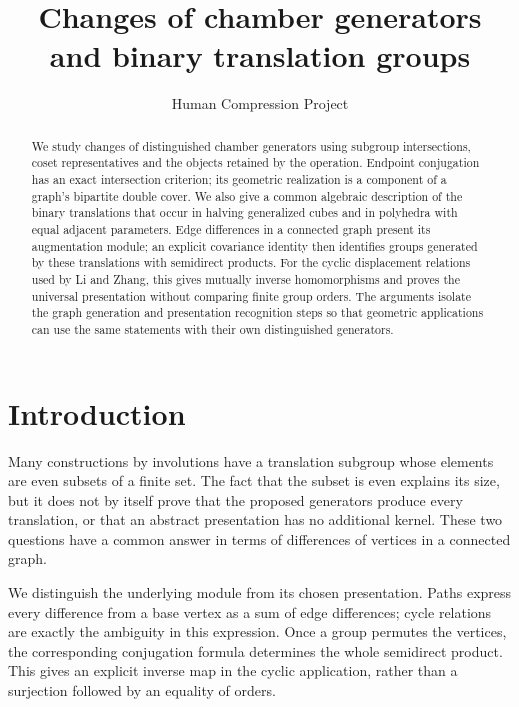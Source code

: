 
\title{Changes of chamber generators and binary translation groups}
\author{Human Compression Project}
\date{}

\maketitle
\begin{abstract}
We study changes of distinguished chamber generators using subgroup
intersections, coset representatives and the objects retained by the
operation. Endpoint conjugation has an exact intersection criterion;
its geometric realization is a component of a graph's bipartite double
cover. We also give a common algebraic description of the binary translations that
occur in halving generalized cubes and in polyhedra with equal adjacent parameters.
Edge differences in a connected graph present its augmentation module;
an explicit covariance identity then identifies groups generated by
these translations with semidirect products. For the cyclic displacement
relations used by Li and Zhang, this gives mutually inverse homomorphisms
and proves the universal presentation without comparing finite group
orders. The arguments isolate the graph generation and presentation
recognition steps so that geometric applications can use the same
statements with their own distinguished generators.
\end{abstract}
\section{Introduction}
Many constructions by involutions have a translation subgroup whose
elements are even subsets of a finite set. The fact that the subset is
even explains its size, but it does not by itself prove that the proposed
generators produce every translation, or that an abstract presentation
has no additional kernel. These two questions have a common answer in
terms of differences of vertices in a connected graph.

We distinguish the underlying module from its chosen presentation.
Paths express every difference from a base vertex as a sum of edge
differences; cycle relations are exactly the ambiguity in this
expression. Once a group permutes the vertices, the corresponding
conjugation formula determines the whole semidirect product. This gives
an explicit inverse map in the cyclic application, rather than a
surjection followed by an equality of orders.

